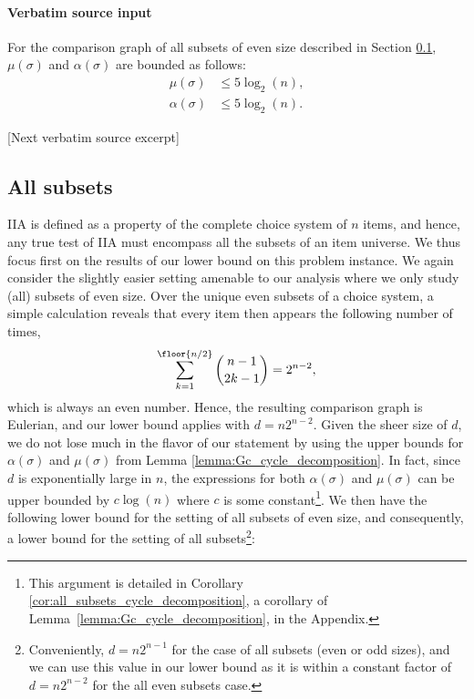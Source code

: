 \documentclass[10pt]{article}
\begin{document}
\paragraph{Verbatim source input}
\begin{ReviewVerbatim}
\begin{cor}[]\label{cor:all_subsets_cycle_decomposition}
			For the comparison graph of all subsets of even size described in Section \ref{subsection:all}, $\mu(\sigma)$ and $\alpha(\sigma)$ are bounded as follows:
			\begin{align*}
			\mu(\sigma) &\leq 5\log_2 (n), \\
			\alpha(\sigma) &\leq 5\log_2 (n).
			\end{align*}
		\end{cor}

[Next verbatim source excerpt]

	\subsection{All subsets}
	\label{subsection:all}
	IIA is defined as a property of the complete choice system of $n$ items, and hence, any true test of IIA must encompass all the subsets of an item universe. We thus focus first on the results of our lower bound on this problem instance. We again consider the slightly easier setting amenable to our analysis where we only study (all) subsets of even size. Over the unique even subsets of a choice system, a simple calculation reveals that every item then appears the following number of times,
	\begin{align*}
	\sum_{k=1}^{\floor{n/2}} \binom{n-1}{2k-1} = 2^{n-2},
	\end{align*}
	which is always an even number. Hence, the resulting comparison graph is Eulerian, and our lower bound applies with $d=n2^{n-2}$. Given the sheer size of $d$, we do not lose much in the flavor of our statement by using the upper bounds for $\alpha(\sigma)$ and $\mu(\sigma)$ from Lemma \ref{lemma:Gc_cycle_decomposition}. In fact, since $d$ is exponentially large in $n$, the expressions for both $\alpha(\sigma)$ and $\mu(\sigma)$ can be upper bounded by $c \log(n)$ where $c$ is some constant\footnote{This argument is detailed in Corollary \ref{cor:all_subsets_cycle_decomposition}, a corollary of Lemma~\ref{lemma:Gc_cycle_decomposition}, in the Appendix.}. We then have the following lower bound for the setting of all subsets of even size, and consequently, a lower bound for the setting of all subsets\footnote{Conveniently, $d=n2^{n-1}$ for the case of all subsets (even or odd sizes), and we can use this value in our lower bound as it is within a constant factor of $d=n2^{n-2}$ for the all even subsets case.}:


\end{ReviewVerbatim}
\end{document}
